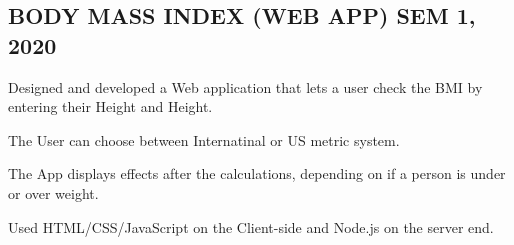 \documentclass[letter,10pt]{article}
\begin{document}
\subsection{{BODY MASS INDEX (WEB APP) \hfill SEM 1, 2020}}
\begin{zitemize}
\item Designed and developed a Web application that lets a user check the BMI by entering their Height and Height.
\item The User can choose between Internatinal or US metric system.
\item The App displays effects after the calculations, depending on if a person is under or over weight.
\item Used HTML/CSS/JavaScript on the Client-side and Node.js on the server end.
\end{zitemize}
\end{document}
